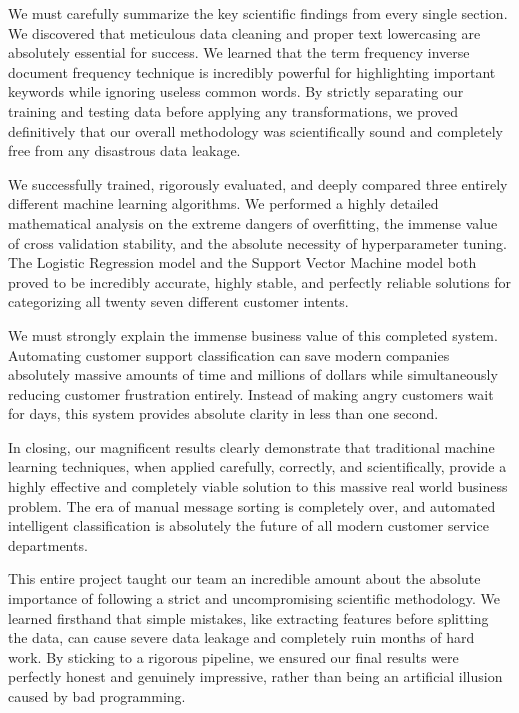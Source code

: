 \documentclass[12pt]{article}
\begin{document}
We must carefully summarize the key scientific findings from every single section. We discovered that meticulous data cleaning and proper text lowercasing are absolutely essential for success. We learned that the term frequency inverse document frequency technique is incredibly powerful for highlighting important keywords while ignoring useless common words. By strictly separating our training and testing data before applying any transformations, we proved definitively that our overall methodology was scientifically sound and completely free from any disastrous data leakage. 

We successfully trained, rigorously evaluated, and deeply compared three entirely different machine learning algorithms. We performed a highly detailed mathematical analysis on the extreme dangers of overfitting, the immense value of cross validation stability, and the absolute necessity of hyperparameter tuning. The Logistic Regression model and the Support Vector Machine model both proved to be incredibly accurate, highly stable, and perfectly reliable solutions for categorizing all twenty seven different customer intents. 

We must strongly explain the immense business value of this completed system. Automating customer support classification can save modern companies absolutely massive amounts of time and millions of dollars while simultaneously reducing customer frustration entirely. Instead of making angry customers wait for days, this system provides absolute clarity in less than one second. 

In closing, our magnificent results clearly demonstrate that traditional machine learning techniques, when applied carefully, correctly, and scientifically, provide a highly effective and completely viable solution to this massive real world business problem. The era of manual message sorting is completely over, and automated intelligent classification is absolutely the future of all modern customer service departments.


This entire project taught our team an incredible amount about the absolute importance of following a strict and uncompromising scientific methodology. We learned firsthand that simple mistakes, like extracting features before splitting the data, can cause severe data leakage and completely ruin months of hard work. By sticking to a rigorous pipeline, we ensured our final results were perfectly honest and genuinely impressive, rather than being an artificial illusion caused by bad programming.
\end{document}
